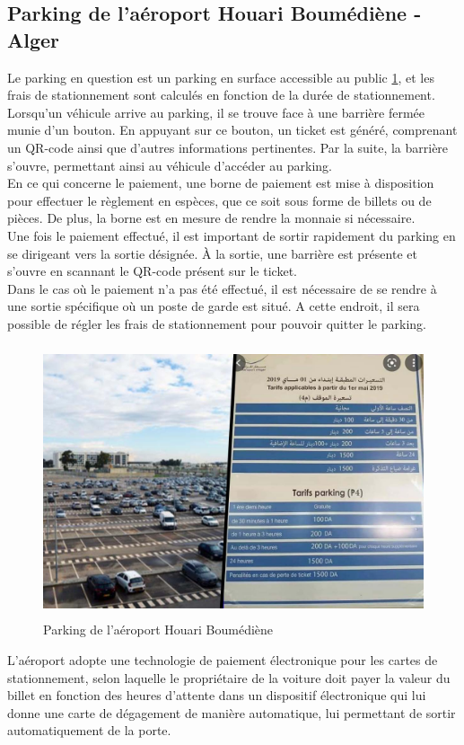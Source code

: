 \subsection{Parking de l'aéroport Houari Boumédiène - Alger}
Le parking en question est un parking en surface accessible au public \ref{Boumédiène}, et les frais de stationnement sont calculés en fonction de la durée de stationnement.
\\
Lorsqu'un véhicule arrive au parking, il se trouve face à une barrière fermée munie d'un bouton. En appuyant sur ce bouton, un ticket est généré, comprenant un QR-code ainsi que d'autres informations pertinentes. Par la suite, la barrière s'ouvre, permettant ainsi au véhicule d'accéder au parking.
\\
En ce qui concerne le paiement, une borne de paiement est mise à disposition pour effectuer le règlement en espèces, que ce soit sous forme de billets ou de pièces. De plus, la borne est en mesure de rendre la monnaie si nécessaire.
\\
Une fois le paiement effectué, il est important de sortir rapidement du parking en se dirigeant vers la sortie désignée. À la sortie, une barrière est présente et s'ouvre en scannant le QR-code présent sur le ticket.
\\
Dans le cas où le paiement n'a pas été effectué, il est nécessaire de se rendre à une sortie spécifique où un poste de garde est situé. A cette endroit, il sera possible de régler les frais de stationnement pour pouvoir quitter le parking.
\begin{figure}[H]
	\centering
	\includegraphics[height=08cm]{img/ch2-Parking aéroport à Alger Houari Boumédiène Airport.jpg}
	\caption{Parking de l'aéroport Houari Boumédiène}
 \label{Boumédiène}
\end{figure}
L'aéroport adopte une technologie de paiement électronique pour les cartes de stationnement, selon laquelle le propriétaire de la voiture doit payer la valeur du billet en fonction des heures d'attente dans un dispositif électronique qui lui donne une carte de dégagement de manière automatique, lui permettant de sortir automatiquement de la porte.

